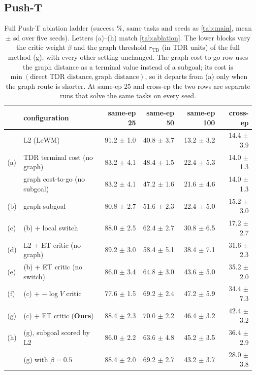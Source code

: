 \documentclass{article} %
\newcommand{\Htd}{r_{\mathrm{TD}}}
\theoremstyle{definition}
\theoremstyle{remark}
\begin{document}
\subsection{Push-T}
\label{app:ablation-pusht}
\begin{table}[h]
\centering\small
\caption{Full Push-T ablation ladder (success \%, same tasks and seeds as \cref{tab:main}, mean
$\pm$ sd over five seeds). Letters (a)--(h) match \cref{tab:ablation}. The lower blocks vary the
critic weight $\beta$ and the graph threshold $\Htd$ (in TDR units) of the full method (g), with
every other setting unchanged. The graph cost-to-go row uses the graph distance as a terminal value
instead of a subgoal; its cost is $\min(\text{direct TDR distance},\text{graph distance})$, so it
departs from (a) only when the graph route is shorter. At same-ep 25 and cross-ep the two rows
are separate runs that solve the same tasks on every seed.}
\label{tab:ladder}
\begin{tabular}{@{}l>{\raggedright\arraybackslash}p{4.3cm}rrrr@{}}
\toprule
& configuration & same-ep 25 & same-ep 50 & same-ep 100 & cross-ep \\
\midrule
& L2 (LeWM) & 91.2 $\pm$ 1.0 & 40.8 $\pm$ 3.7 & 13.2 $\pm$ 3.2 & 14.4 $\pm$ 3.9 \\
(a) & TDR terminal cost (no graph) & 83.2 $\pm$ 4.1 & 48.4 $\pm$ 1.5 & 22.4 $\pm$ 5.3 & 14.0 $\pm$ 1.3 \\
& graph cost-to-go (no subgoal) & 83.2 $\pm$ 4.1 & 47.2 $\pm$ 1.6 & 21.6 $\pm$ 4.6 & 14.0 $\pm$ 1.3 \\
(b) & graph subgoal & 80.8 $\pm$ 2.7 & 51.6 $\pm$ 2.3 & 22.4 $\pm$ 5.0 & 15.2 $\pm$ 3.0 \\
(c) & (b) + local switch & 88.0 $\pm$ 2.5 & 62.4 $\pm$ 2.7 & 30.8 $\pm$ 6.5 & 17.2 $\pm$ 2.7 \\
\midrule
(d) & L2 + ET critic (no graph) & 89.2 $\pm$ 3.0 & 58.4 $\pm$ 5.1 & 38.4 $\pm$ 7.1 & 31.6 $\pm$ 2.3 \\
(e) & (b) + ET critic (no switch) & 86.0 $\pm$ 3.4 & 64.8 $\pm$ 3.0 & 43.6 $\pm$ 5.0 & 35.2 $\pm$ 2.0 \\
(f) & (c) + $-\log V$ critic & 77.6 $\pm$ 1.5 & 69.2 $\pm$ 2.4 & 47.2 $\pm$ 5.9 & 34.4 $\pm$ 7.3 \\
(g) & (c) + ET critic (\textbf{Ours}) & 88.4 $\pm$ 2.3 & 70.0 $\pm$ 2.2 & 46.4 $\pm$ 3.2 & 42.4 $\pm$ 3.2 \\
(h) & (g), subgoal scored by L2 & 86.0 $\pm$ 2.2 & 63.6 $\pm$ 4.8 & 45.2 $\pm$ 3.5 & 36.4 $\pm$ 2.9 \\
\midrule
& (g) with $\beta=0.5$ & 88.4 $\pm$ 2.0 & 69.2 $\pm$ 2.7 & 43.2 $\pm$ 3.7 & 28.0 $\pm$ 3.8 \\

\end{tabular}
\end{table}
\end{document}
